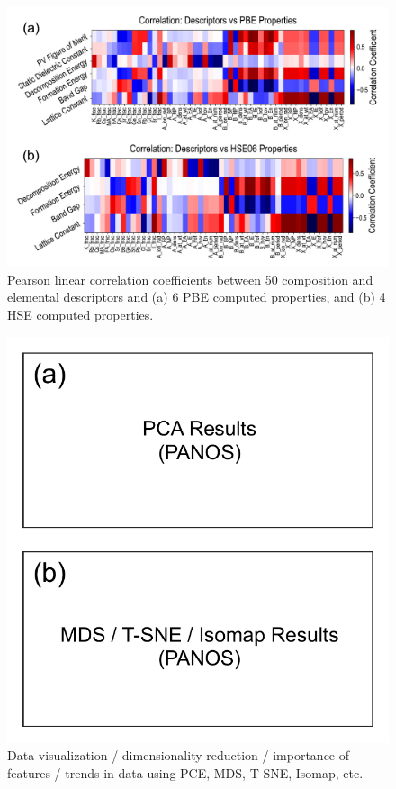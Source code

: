 \documentclass[twoside,twocolumn,9pt]{article}
\begin{document}
\begin{figure}[h]
\centering
\includegraphics[width=0.99\linewidth]{Figure4.pdf}
\caption{\label{Fig:outline} 
Pearson linear correlation coefficients between 50 composition and elemental descriptors and (a) 6 PBE computed properties, and (b) 4 HSE computed properties.}
\end{figure}


\begin{figure}[h]
\centering
\includegraphics[width=0.80\linewidth]{Figure5.pdf}
\caption{\label{Fig:outline} 
Data visualization / dimensionality reduction / importance of features / trends in data using PCE, MDS, T-SNE, Isomap, etc.}
\end{figure}
\end{document}
